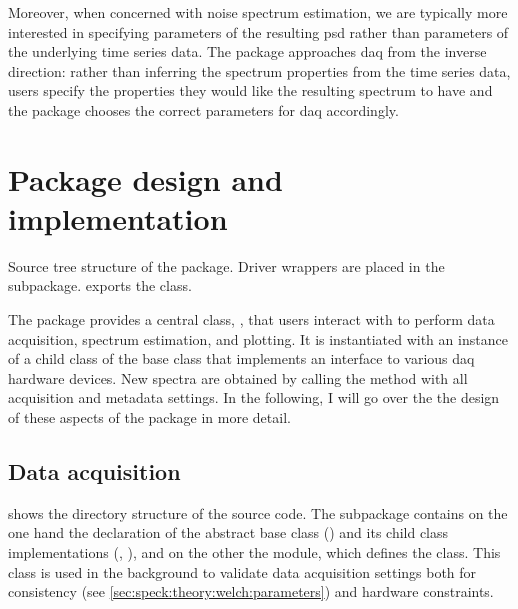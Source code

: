 Moreover, when concerned with noise spectrum estimation, we are typically more interested in specifying parameters of the resulting \gls{psd} rather than parameters of the underlying time series data.
The \pyspeck package approaches \acrlong{daq} from the inverse direction: rather than inferring the spectrum properties from the time series data, users specify the properties they would like the resulting spectrum to have and the package chooses the correct parameters for \acrlong{daq} accordingly.

\section{Package design and implementation}\label{sec:speck:software:design}
\begin{marginfigure}[*-10]
    
    \caption[Source tree structure of the \pyspeck package.]{
        Source tree structure of the \pyspeck package.
        Driver wrappers are placed in the  subpackage.
         exports the  class.
    }
    \label{fig:speck:software:tree}
\end{marginfigure}
The \pyspeck package provides a central class, , that users interact with to perform data acquisition, spectrum estimation, and plotting.
It is instantiated with an instance of a child class of the  base class that implements an interface to various \gls{daq} hardware devices.
New spectra are obtained by calling the  method with all acquisition and metadata settings.
In the following, I will go over the the design of these aspects of the package in more detail.

\subsection{Data acquisition}\label{subsec:speck:software:design:daq}
 shows the directory structure of the source code.
The  subpackage contains on the one hand the declaration of the  abstract base class () and its child class implementations (, \etc), and on the other the  module, which defines the  class.
This class is used in the background to validate data acquisition settings both for consistency (see \cref{sec:speck:theory:welch:parameters}) and hardware constraints.

